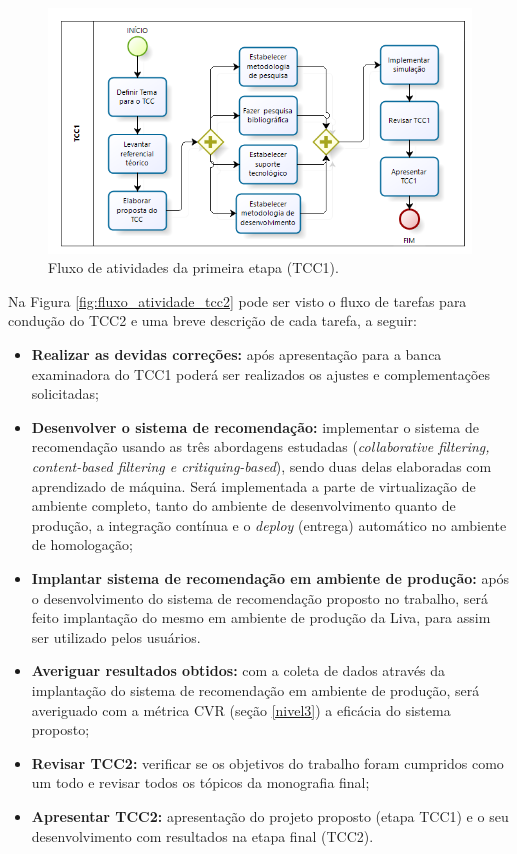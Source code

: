 \begin{figure}[H]
    \centering
    \includegraphics[scale=0.9]{figuras/proposta/fluxo_atividade_tcc1.png}
    \caption[Fluxo de atividades da primeira etapa (TCC1)]{Fluxo de atividades da primeira etapa (TCC1).}
    \label{fig:fluxo_atividade_tcc1}
\end{figure}

Na Figura \ref{fig:fluxo_atividade_tcc2} pode ser visto o fluxo de tarefas para condução do TCC2 e uma breve descrição de cada tarefa, a seguir:

\begin{itemize}
    \item \textbf{Realizar as devidas correções:} após apresentação para a banca examinadora do TCC1 poderá ser realizados os ajustes e complementações solicitadas;

    \item \textbf{Desenvolver o sistema de recomendação:} implementar o sistema de recomendação usando as três abordagens estudadas (\textit{collaborative filtering, content-based filtering e critiquing-based}), sendo duas delas elaboradas com aprendizado de máquina. Será implementada a parte de virtualização de ambiente completo, tanto do ambiente de desenvolvimento quanto de produção, a integração contínua e o \textit{deploy} (entrega) automático no ambiente de homologação;

    \item \textbf{Implantar sistema de recomendação em ambiente de produção:} após o desenvolvimento do sistema de recomendação proposto no trabalho, será feito implantação do mesmo em ambiente de produção da Liva, para assim ser utilizado pelos usuários.

    \item \textbf{Averiguar resultados obtidos:} com a coleta de dados através da implantação do sistema de recomendação em ambiente de produção, será averiguado com a métrica CVR (seção \ref{nivel3}) a eficácia do sistema proposto;
    
    \item \textbf{Revisar TCC2:} verificar se os objetivos do trabalho foram cumpridos como um todo e revisar todos os tópicos da monografia final;

    \item \textbf{Apresentar TCC2:} apresentação do projeto proposto (etapa TCC1) e o seu desenvolvimento com resultados na etapa final (TCC2).
    
\end{itemize}

